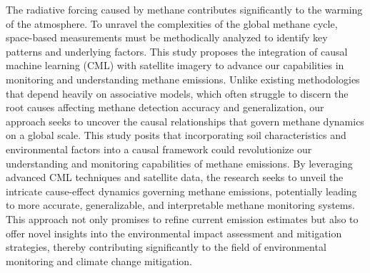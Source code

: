 \acresetall

The radiative forcing caused by methane contributes significantly to the warming of the atmosphere. To unravel the complexities of the global methane cycle, space-based measurements must be methodically analyzed to identify key patterns and underlying factors. This study proposes the integration of causal machine learning (CML) with satellite imagery to advance our capabilities in monitoring and understanding methane emissions. Unlike existing methodologies that depend heavily on associative models, which often struggle to discern the root causes affecting methane detection accuracy and generalization, our approach seeks to uncover the causal relationships that govern methane dynamics on a global scale. This study posits that incorporating soil characteristics and environmental factors into a causal framework could revolutionize our understanding and monitoring capabilities of methane emissions. By leveraging advanced CML techniques and satellite data, the research seeks to unveil the intricate cause-effect dynamics governing methane emissions, potentially leading to more accurate, generalizable, and interpretable methane monitoring systems. This approach not only promises to refine current emission estimates but also to offer novel insights into the environmental impact assessment and mitigation strategies, thereby contributing significantly to the field of environmental monitoring and climate change mitigation.